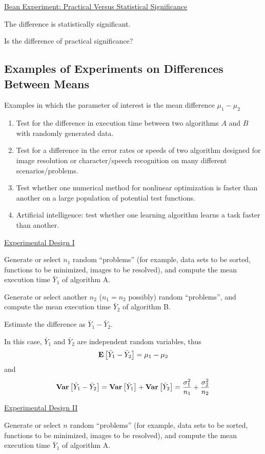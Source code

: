 \underline{Bean Experiment: Practical Versus Statistical Significance}

The difference is statistically significant.

Is the difference of practical significance?

\subsection{Examples of Experiments on Differences Between Means}
Examples in which the parameter of interest is the mean difference $\mu_{1}-\mu_{2}$
\begin{enumerate}
    \item Test for the difference in execution time between two algorithms
          $A$ and $B$ with randomly generated data.
    \item Test for a difference in the error rates or speeds of two algorithm
          designed for image resolution or character/speech recognition on many different scenarios/problems.
    \item Test whether one numerical method for nonlinear optimization is faster
          than another on a large population of potential test functions.
    \item Artificial intelligence: test whether one learning algorithm learns a task faster than another.
\end{enumerate}

\underline{Experimental Design I}

Generate or select $n_{1}$ random ``problems'' (for example, data sets to be sorted,
functions to be minimized, images to be resolved), and compute the mean execution time $\bar{Y}_{1}$ of
algorithm A.

Generate or select another $n_{2}$ ($n_{1}=n_{2}$ possibly)
random ``problems'', and compute the mean execution time $\bar{Y}_{2}$ of algorithm B.

Estimate the difference as $\bar{Y}_{1}-\bar{Y}_{2}$.

In this case, $\bar{Y}_{1}$ and $\bar{Y}_{2}$ are independent random variables, thus
\[\bm{\mathrm{E}}\left[\bar{Y}_{1}-\bar{Y}_{2}\right]=\mu_{1}-\mu_{2}\]
and
\[\bm{\mathrm{Var}}\left[\bar{Y}_{1}-\bar{Y}_{2}\right]
    =\bm{\mathrm{Var}}\left[\bar{Y}_{1}\right]+\bm{\mathrm{Var}}\left[\bar{Y}_{2}\right]
    =\frac{\sigma_{1}^{2}}{n_{1}}+\frac{\sigma_{2}^{2}}{n_{2}}
\]

\underline{Experimental Design II}

Generate or select $n$ random ``problems''
(for example, data sets to be sorted, functions to be minimized, images to be resolved),
and compute the mean execution time $\bar{Y}_{1}$ of algorithm A.

